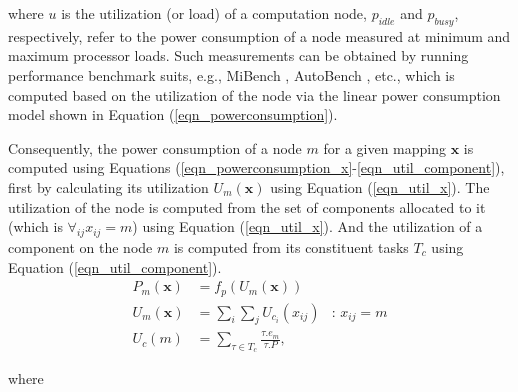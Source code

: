 where $u$ is the utilization (or load) of a computation node, $p_{idle}$ and $p_{busy}$, respectively, refer to the power consumption of a node measured at minimum and maximum processor loads. Such measurements can be obtained by running performance benchmark suits, e.g., MiBench \cite{Guthaus2001MiBench:Suite}, AutoBench \cite{EMBC2018AutoBenchProcessors}, etc., which is computed based on the utilization of the node via the linear power consumption model shown in Equation (\ref{eqn_powerconsumption}).

Consequently, the power consumption of a node $m$ for a given mapping $\textbf{x}$ is computed using Equations (\ref{eqn_powerconsumption_x}-\ref{eqn_util_component}), first by calculating its utilization $U_m(\textbf{x})$ using Equation (\ref{eqn_util_x}). The utilization of the node is computed from the set of components allocated to it (which is $\forall_{ij} x_{ij}=m$) using Equation (\ref{eqn_util_x}). And the utilization of a component on the node $m$ is computed from its constituent tasks $T_c$ using Equation (\ref{eqn_util_component}).
\begin{align}
\label{eqn_powerconsumption_x}
P_m(\textbf{x})&=f_p(U_m(\textbf{x}))\\
\label{eqn_util_x}
U_{m}(\textbf{x}) &= \sum_{i}{\sum_{j}{U_{c_i}}(x_{ij})} & \text{: }x_{ij}=m\\
\label{eqn_util_component}
U_c(m) &= \sum_{\tau\in T_c} \frac{\tau.e_m}{\tau.P},&
\end{align}

where


